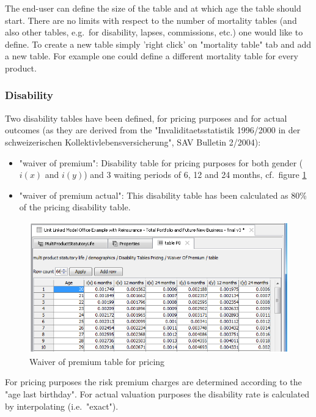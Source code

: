 The end-user can define the size of the table and at which age the table should start. There are no limits with respect to the number of mortality tables (and also other tables, e.g.~for disability, lapses, commissions, etc.) one would like to define. To create a new table simply 'right click' on "mortality table" tab and add a new table. For example one could define a different mortality table for every product.

\subsubsection{Disability}

Two disability tables have been defined, for pricing purposes and for actual outcomes (as they are derived from the "Invaliditaetsstatistik 1996/2000 in der schweizerischen Kollektivlebensversicherung", SAV Bulletin 2/2004):
\begin{itemize}
	\item "waiver of premium": Disability table for pricing purposes for both gender ($i(x)$ and $i(y)$) and 3 waiting periods of 6, 12 and 24 months, cf.~figure \ref{fig:mdpwaiverofpremium}
	\item "waiver of premium actual": This disability table has been calculated as 80\% of the pricing disability table.
\end{itemize}

\begin{figure}
\includegraphics[scale=0.7]{images/mdpwaiverofpremium.png}
	\caption{Waiver of premium table for pricing}
	\label{fig:mdpwaiverofpremium}
\end{figure}

For pricing purposes the risk premium charges are determined according to the "age last birthday". For actual valuation purposes the disability rate is calculated by interpolating (i.e.~"exact").

